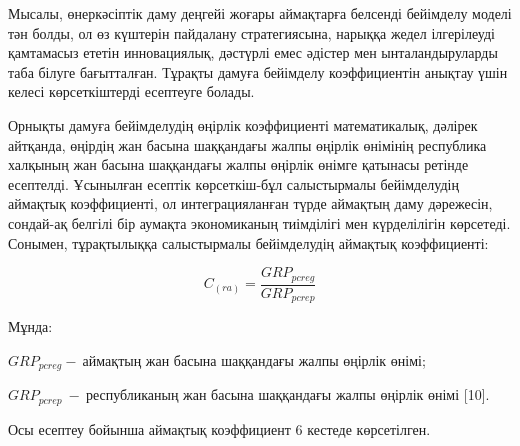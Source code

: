 \begin{multicols}{2}
Мысалы, өнеркәсіптік даму деңгейі жоғары аймақтарға белсенді бейімделу
моделі тән болды, ол өз күштерін пайдалану стратегиясына, нарыққа жедел
ілгерілеуді қамтамасыз ететін инновациялық, дәстүрлі емес әдістер мен
ынталандыруларды таба білуге бағытталған. Тұрақты дамуға бейімделу
коэффициентін анықтау үшін келесі көрсеткіштерді есептеуге болады.

Орнықты дамуға бейімделудің өңірлік коэффициенті математикалық, дәлірек
айтқанда, өңірдің жан басына шаққандағы жалпы өңірлік өнімінің
республика халқының жан басына шаққандағы жалпы өңірлік өнімге қатынасы
ретінде есептелді. Ұсынылған есептік көрсеткіш-бұл салыстырмалы
бейімделудің аймақтық коэффициенті, ол интеграцияланған түрде аймақтың
даму дәрежесін, сондай-ақ белгілі бір аумақта экономиканың тиімділігі
мен күрделілігін көрсетеді. Сонымен, тұрақтылыққа салыстырмалы
бейімделудің аймақтық коэффициенті:

\[C_{(ra)} = \frac{{GRP}_{pcreg}}{{GRP}_{pcrep}}\]

Мұнда:

\({GRP}_{pcreg} - \ аймақтың\) жан басына шаққандағы жалпы өңірлік
өнімі;

\({GRP}_{pcrep}\  - \ \)республиканың жан басына шаққандағы жалпы
өңірлік өнімі {[}10{]}.

Осы есептеу бойынша аймақтық коэффициент 6 кестеде көрсетілген.
\end{multicols}


